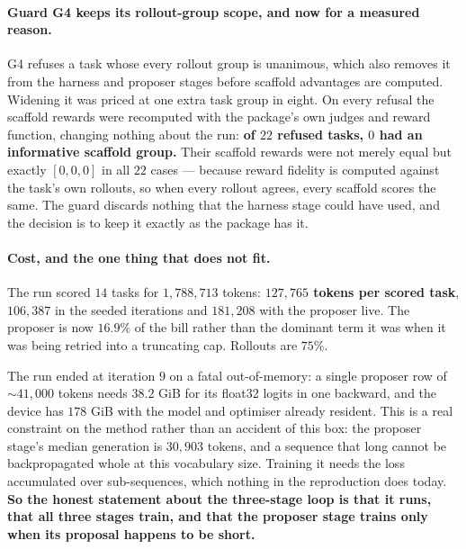\paragraph{Guard G4 keeps its rollout-group scope, and now for a measured reason.} G4 refuses a
task whose every rollout group is unanimous, which also removes it from the harness and
proposer stages before scaffold advantages are computed. Widening it was priced at one extra
task group in eight. On every refusal the scaffold rewards were recomputed with the package's
own judges and reward function, changing nothing about the run: \textbf{of $22$ refused tasks,
$0$ had an informative scaffold group.} Their scaffold rewards were not merely equal but exactly
$[0,0,0]$ in all $22$ cases --- because reward fidelity is computed against the task's own rollouts, so when
every rollout agrees, every scaffold scores the same. The guard discards nothing that the
harness stage could have used, and the decision is to keep it exactly as the package has it.

\paragraph{Cost, and the one thing that does not fit.} The run scored $14$ tasks for
$1{,}788{,}713$ tokens: \textbf{$127{,}765$ tokens per scored task}, $106{,}387$ in the seeded
iterations and $181{,}208$ with the proposer live. The proposer is now $16.9\%$ of the bill
rather than the dominant term it was when it was being retried into a truncating cap. Rollouts
are $75\%$.

The run ended at iteration $9$ on a fatal out-of-memory: a single proposer row of ${\sim}41{,}000$
tokens needs $38.2$ GiB for its float32 logits in one backward, and the device has $178$ GiB
with the model and optimiser already resident. This is a real constraint on the method rather
than an accident of this box: the proposer stage's median generation is $30{,}903$ tokens, and a
sequence that long cannot be backpropagated whole at this vocabulary size. Training it needs
the loss accumulated over sub-sequences, which nothing in the reproduction does today.
\textbf{So the honest statement about the three-stage loop is that it runs, that all three
stages train, and that the proposer stage trains only when its proposal happens to be short.}

